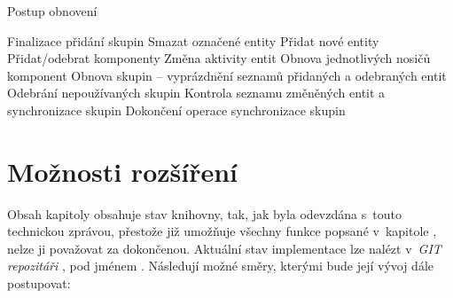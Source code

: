 \begin{algorithm}
	\caption{Postup obnovení}
	\label{Alg:Refresh}
	
	\begin{algorithmic}[1]
		
			\EMBlockStart
				\State Finalizace přidání skupin
			\EMBlockEnd
			\ACBlockStart
				\State Smazat označené entity
				\State Přidat nové entity
				\State Přidat/odebrat komponenty
				\State Změna aktivity entit
			\ACBlockEnd
			\CMBlockStart
				\State Obnova jednotlivých nosičů komponent
			\CMBlockEnd
			\GMBlockStart
				\State Obnova skupin -- vyprázdnění seznamů přidaných a odebraných entit
				\State Odebrání nepoužívaných skupin
				\State Kontrola seznamu změněných entit a synchronizace skupin
				\State Dokončení operace synchronizace skupin
			\GMBlockEnd
		\EndFunction
	\end{algorithmic}
\end{algorithm}

\pagebreak
\section{Možnosti rozšíření}
\label{Chap:ExtensionOptions}

Obsah kapitoly  obsahuje stav knihovny, tak, jak byla odevzdána s~touto technickou zprávou, přestože již umožňuje všechny funkce popsané v~kapitole , nelze ji považovat za dokončenou. Aktuální stav implementace lze nalézt v~\emph{GIT repozitáři} \cite{EntropyGit}, pod jménem . Následují možné směry, kterými bude její vývoj dále postupovat: 

